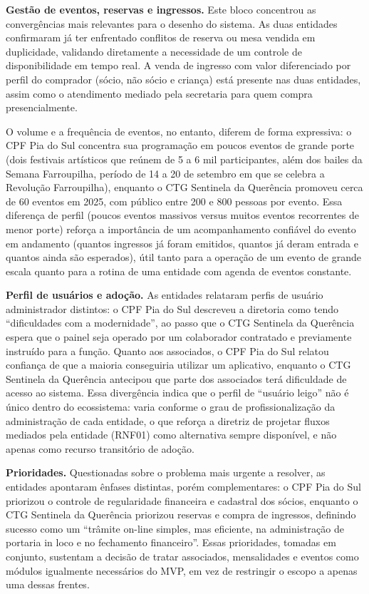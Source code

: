 \documentclass[12pt,a4paper]{article}
\begin{document}
\textbf{Gestão de eventos, reservas e ingressos.} Este bloco concentrou as convergências mais
relevantes para o desenho do sistema. As duas entidades confirmaram já ter enfrentado conflitos de
reserva ou mesa vendida em duplicidade, validando diretamente a necessidade de um controle de
disponibilidade em tempo real. A venda de ingresso com valor diferenciado por perfil do comprador
(sócio, não sócio e criança) está presente nas duas entidades, assim como o atendimento mediado pela
secretaria para quem compra presencialmente.

O volume e a frequência de eventos, no entanto, diferem
de forma expressiva: o CPF Pia do Sul concentra sua programação em poucos eventos de grande porte
(dois festivais artísticos que reúnem de 5 a 6 mil participantes, além dos bailes da Semana
Farroupilha, período de 14 a 20 de setembro em que se celebra a Revolução Farroupilha), enquanto o CTG Sentinela da Querência promoveu cerca de 60 eventos em 2025, com
público entre 200 e 800 pessoas por evento. Essa diferença de perfil (poucos eventos massivos versus
muitos eventos recorrentes de menor porte) reforça a importância de um acompanhamento confiável do
evento em andamento (quantos ingressos já foram emitidos, quantos já deram entrada e quantos ainda
são esperados), útil tanto para a operação de um evento de grande escala quanto para a rotina de uma
entidade com agenda de eventos constante.

\textbf{Perfil de usuários e adoção.} As entidades relataram perfis de usuário administrador
distintos: o CPF Pia do Sul descreveu a diretoria como tendo ``dificuldades com a modernidade'', ao
passo que o CTG Sentinela da Querência espera que o painel seja operado por um colaborador contratado
e previamente instruído para a função. Quanto aos associados, o CPF Pia do Sul relatou confiança de
que a maioria conseguiria utilizar um aplicativo, enquanto o CTG Sentinela da Querência antecipou que
parte dos associados terá dificuldade de acesso ao sistema. Essa divergência indica que o perfil de
``usuário leigo'' não é único dentro do ecossistema: varia conforme o grau de profissionalização da
administração de cada entidade, o que reforça a diretriz de projetar fluxos mediados pela entidade
(RNF01) como alternativa sempre disponível, e não apenas como recurso transitório de adoção.

\textbf{Prioridades.} Questionadas sobre o problema mais urgente a resolver, as entidades apontaram
ênfases distintas, porém complementares: o CPF Pia do Sul priorizou o controle de regularidade
financeira e cadastral dos sócios, enquanto o CTG Sentinela da Querência priorizou reservas e compra
de ingressos, definindo sucesso como um ``trâmite on-line simples, mas eficiente, na administração de
portaria in loco e no fechamento financeiro''. Essas prioridades, tomadas em conjunto, sustentam a
decisão de tratar associados, mensalidades e eventos como módulos igualmente necessários do MVP, em
vez de restringir o escopo a apenas uma dessas frentes.
\end{document}
